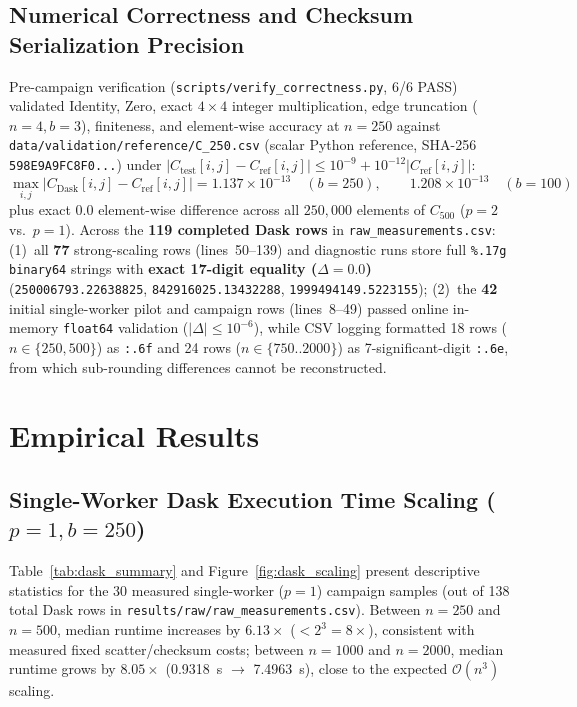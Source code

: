\documentclass[11pt,a4paper]{article}
\begin{document}
\subsection{Numerical Correctness and Checksum Serialization Precision}
Pre-campaign verification (\nolinkurl{scripts/verify_correctness.py}, 6/6 PASS) validated Identity, Zero, exact $4 \times 4$ integer multiplication, edge truncation ($n=4, b=3$), finiteness, and element-wise accuracy at $n=250$ against \nolinkurl{data/validation/reference/C_250.csv} (scalar Python reference, SHA-256 \texttt{598E9A9FC8F0...}) under $|C_{\text{test}}[i,j] - C_{\text{ref}}[i,j]| \le 10^{-9} + 10^{-12}|C_{\text{ref}}[i,j]|$:
\begin{equation}
\max_{i,j} |C_{\text{Dask}}[i, j] - C_{\text{ref}}[i, j]| = 1.137 \times 10^{-13} \quad (b=250), \qquad 1.208 \times 10^{-13} \quad (b=100)
\end{equation}
plus exact $0.0$ element-wise difference across all $250{,}000$ elements of $C_{500}$ ($p=2$ vs.\ $p=1$). Across the \textbf{119 completed Dask rows} in \nolinkurl{raw_measurements.csv}: (1)~all \textbf{77} strong-scaling rows (lines~50--139) and diagnostic runs store full \texttt{\%.17g} \texttt{binary64} strings with \textbf{exact 17-digit equality ($\Delta = 0.0$)} (\texttt{250006793.22638825}, \texttt{842916025.13432288}, \texttt{1999494149.5223155}); (2)~the \textbf{42} initial single-worker pilot and campaign rows (lines~8--49) passed online in-memory \texttt{float64} validation ($|\Delta| \le 10^{-6}$), while CSV logging formatted 18 rows ($n \in \{250, 500\}$) as \texttt{:.6f} and 24 rows ($n \in \{750..2000\}$) as 7-significant-digit \texttt{:.6e}, from which sub-rounding differences cannot be reconstructed.

\section{Empirical Results}

\subsection{Single-Worker Dask Execution Time Scaling (\texorpdfstring{$p = 1, b = 250$}{p=1, b=250})}
Table~\ref{tab:dask_summary} and Figure~\ref{fig:dask_scaling} present descriptive statistics for the 30 measured single-worker ($p=1$) campaign samples (out of 138 total Dask rows in \nolinkurl{results/raw/raw_measurements.csv}). Between $n=250$ and $n=500$, median runtime increases by $6.13\times$ ($< 2^3 = 8\times$), consistent with measured fixed scatter/checksum costs; between $n=1000$ and $n=2000$, median runtime grows by $8.05\times$ (\SI{0.9318}{\second} $\to$ \SI{7.4963}{\second}), close to the expected $\mathcal{O}(n^3)$ scaling.
\end{document}
